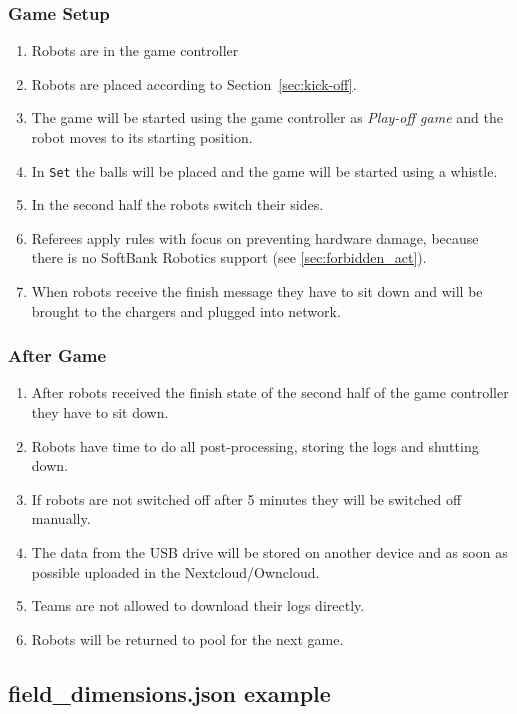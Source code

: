 \subsubsection{Game Setup}

	\begin{enumerate}
		\item Robots are in the game controller
		\item Robots are placed according to Section~\ref{sec:kick-off}.
		\item The game will be started using the game controller as \textit{Play-off game} and the robot moves to its starting position.
		\item In \texttt{Set} the balls will be placed and the game will be started using a whistle.
		\item In the second half the robots switch their sides.
		\item Referees apply rules with focus on preventing hardware damage, because there is no SoftBank Robotics support (see \ref{sec:forbidden_act}).
		\item When robots receive the finish message they have to sit down and will be brought to the chargers and plugged into network.
	\end{enumerate}
	
\subsubsection{After Game}
	
	\begin{enumerate}
		\item After robots received the finish state of the second half of the game controller they have to sit down.
		\item Robots have time to do all post-processing, storing the logs and shutting down.
		\item If robots are not switched off after 5 minutes they will be switched off manually.
		\item The data from the USB drive will be stored on another device and as soon as possible uploaded in the Nextcloud/Owncloud.
		\item Teams are not allowed to download their logs directly.
		\item Robots will be returned to pool for the next game.
	\end{enumerate}

\subsection{field\_dimensions.json example}
\label{sec:fielddimensionsjson}

